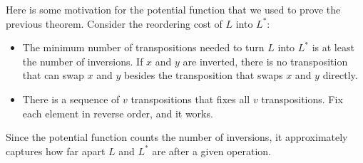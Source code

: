 \begin{example}
\exlabel

Here is some motivation for the potential function that we used to prove the previous theorem. Consider the reordering cost of $L$ into $L^*$:\vspace{-0.1cm}
\begin{itemize}
    \item The minimum number of transpositions needed to turn $L$ into $L^*$ is at least the number of inversions. If $x$ and $y$ are inverted, there is no transposition that can swap $x$ and $y$ besides the transposition that swaps $x$ and $y$ directly.
    \item There is a sequence of $v$ transpositions that fixes all $v$ transpositions. Fix each element in reverse order, and it works.
\end{itemize}
Since the potential function counts the number of inversions, it approximately captures how far apart $L$ and $L^*$ are after a given operation. 
\end{example}